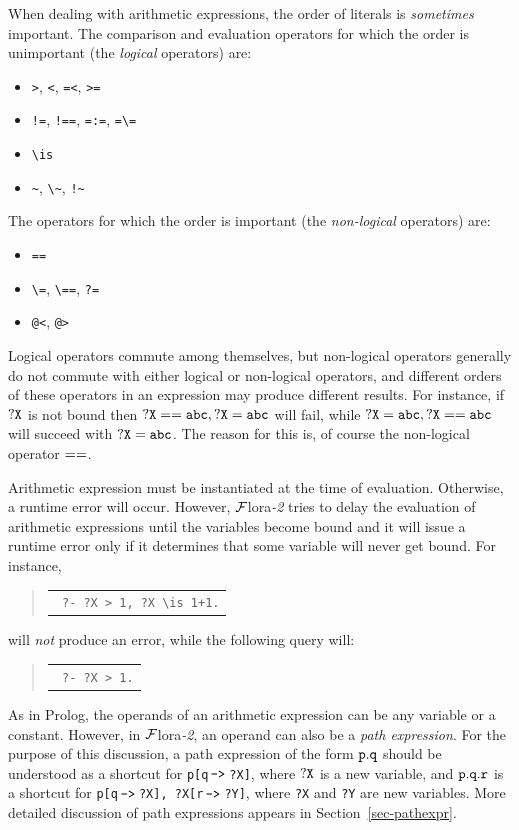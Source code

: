\documentclass[11pt]{article}
\newcommand{\FLORA}{{\mbox{\sc ${\cal F}${lora}\rm\emph{-2}}}\xspace}
\newcommand{\FLSYSTEM}{\FLORA}
\newenvironment{qrules}{\begin{quote}\tt\begin{tabular}[t]{l}}%
{\end{tabular}\end{quote}}
\newcommand{\mvd}{{\mbox{\tt \,->\,}}}  %
\newcommand{\bs}{\textbackslash}
\begin{document}
When dealing with arithmetic expressions, the order of literals is
\emph{sometimes} important.
The comparison and evaluation operators for which the order is unimportant
(the \emph{logical} operators)  are:
\begin{itemize}
\item  \texttt{>}, \texttt{<}, \texttt{=<}, \texttt{>=}
\item  \texttt{!=}, \texttt{!==}, \texttt{=:=}, \texttt{=\bs=}
\item \texttt{\bs{}is}
\item \texttt{\~}, \texttt{\bs\~}, \texttt{!\~}
\end{itemize}
The operators for which the order is important (the \emph{non-logical}
operators) are:
\begin{itemize}
\item  \texttt{==}
\item  \texttt{\bs=}, \texttt{\bs==}, \texttt{?=}
\item  \texttt{@<}, \texttt{@>}
\end{itemize}
Logical operators commute among themselves, but non-logical operators
generally do not commute with either logical or non-logical operators, and
different orders of these operators in an expression  may produce different
results. For instance, if $\tt ?X$ is not bound then $\tt ?X == abc, ?X=abc$ will
fail, while  $\tt ?X=abc, ?X == abc$ will succeed with $\tt ?X = abc$.
The reason for this is, of course the non-logical operator $\tt ==$.

Arithmetic expression must be instantiated at the time of
evaluation. Otherwise, a runtime error will occur.
However, \FLSYSTEM tries to delay the evaluation of arithmetic expressions
until the variables become bound and it will issue a runtime error only if
it determines that some variable will never get bound.
For instance,
\begin{qrules}
  \tt
?- ?X > 1, ?X \bs{}is 1+1.
\end{qrules}
will \emph{not}  produce an error, while the following query will:
\begin{qrules}
  \tt
?-  ?X > 1.
\end{qrules}

As in Prolog, the operands of an arithmetic expression can be any variable
or a constant. However, in \FLSYSTEM, an operand can also be a \emph{path
  expression}. For the purpose of this discussion, a path expression of the
form $\tt p.q$ should be understood as a shortcut for {\tt p[q$\mvd$?X]}, where
$\tt ?X$ is a new variable, and $\tt p.q.r$ is a shortcut for {\tt p[q$\mvd$?X],
  ?X[r$\mvd$?Y]}, where \texttt{?X} and \texttt{?Y} are new variables.
More detailed discussion
of path expressions appears in Section~\ref{sec-pathexpr}.
\end{document}
